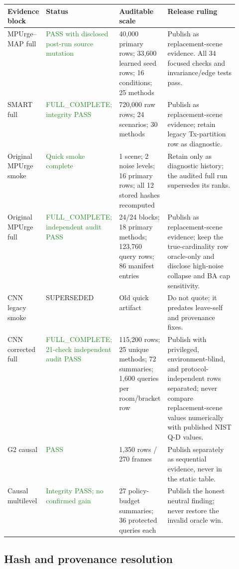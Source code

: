 \documentclass[10pt]{article}
\newcommand{\good}[1]{\textcolor{ForestGreen}{#1}}
\newcommand{\caution}[1]{\textcolor{BrickRed}{#1}}
\begin{document}
\small
\begin{tabularx}{\linewidth}{@{}p{0.16\linewidth}p{0.18\linewidth}p{0.20\linewidth}Y@{}}
\toprule Evidence block & Status & Auditable scale & Release ruling\\\midrule
MPUrge--MAP full & \good{PASS with disclosed post-run source mutation} & 40,000 primary rows; 33,600 learned seed rows; 16 conditions; 25 methods & Publish as replacement-scene evidence. All 34 focused checks and invariance/edge tests pass.\\
SMART full & \good{FULL\_COMPLETE; integrity PASS} & 720,000 raw rows; 24 scenarios; 30 methods & Publish as replacement-scene evidence; retain legacy Tx-partition row as diagnostic.\\
Original MPUrge smoke & \good{Quick smoke complete} & 1 scene; 2 noise levels; 16 primary rows; all 12 stored hashes recomputed & Retain only as diagnostic history; the audited full run supersedes its ranks.\\
Original MPUrge full & \good{FULL\_COMPLETE; independent audit PASS} & 24/24 blocks; 18 primary methods; 123,760 query rows; 86 manifest entries & Publish as replacement-scene evidence; keep the true-cardinality row oracle-only and disclose high-noise collapse and BA cap sensitivity.\\
CNN legacy smoke & \caution{SUPERSEDED} & Old quick artifact & Do not quote; it predates leave-self and provenance fixes.\\
CNN corrected full & \good{FULL\_COMPLETE; 21-check independent audit PASS} & 115,200 rows; 25 unique methods; 72 summaries; 1,600 queries per room/bracket row & Publish with privileged, environment-blind, and protocol-independent rows separated; never compare replacement-scene values numerically with published NIST Q-D values.\\
G2 causal & \good{PASS} & 1,350 rows / 270 frames & Publish separately as sequential evidence, never in the static table.\\
Causal multilevel & \good{Integrity PASS; no confirmed gain} & 27 policy-budget summaries; 36 protected queries each & Publish the honest neutral finding; never restore the invalid oracle win.\\
\bottomrule
\end{tabularx}
\normalsize

\subsection{Hash and provenance resolution}
\end{document}
